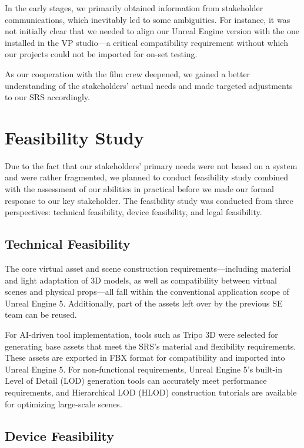 \documentclass[12pt,a4paper]{report}
\begin{document}
In the early stages, we primarily obtained information from stakeholder communications, which inevitably led to some ambiguities. For instance, it was not initially clear that we needed to align our Unreal Engine version with the one installed in the VP studio—a critical compatibility requirement without which our projects could not be imported for on-set testing.

As our cooperation with the film crew deepened, we gained a better understanding of the stakeholders' actual needs and made targeted adjustments to our SRS accordingly.

\section{Feasibility Study}

Due to the fact that our stakeholders' primary needs were not based on a system and were rather fragmented, we planned to conduct feasibility study combined with the assessment of our abilities in practical before we made our formal response to our key stakeholder. The feasibility study was conducted from three perspectives: technical feasibility, device feasibility, and legal feasibility.

\subsection{Technical Feasibility}

The core virtual asset and scene construction requirements—including material and light adaptation of 3D models, as well as compatibility between virtual scenes and physical props—all fall within the conventional application scope of Unreal Engine 5. Additionally, part of the assets left over by the previous SE team can be reused.

For AI-driven tool implementation, tools such as Tripo 3D were selected for generating base assets that meet the SRS's material and flexibility requirements. These assets are exported in FBX format for compatibility and imported into Unreal Engine 5. For non-functional requirements, Unreal Engine 5's built-in Level of Detail (LOD) generation tools can accurately meet performance requirements, and Hierarchical LOD (HLOD) construction tutorials are available for optimizing large-scale scenes.

\subsection{Device Feasibility}
\end{document}
